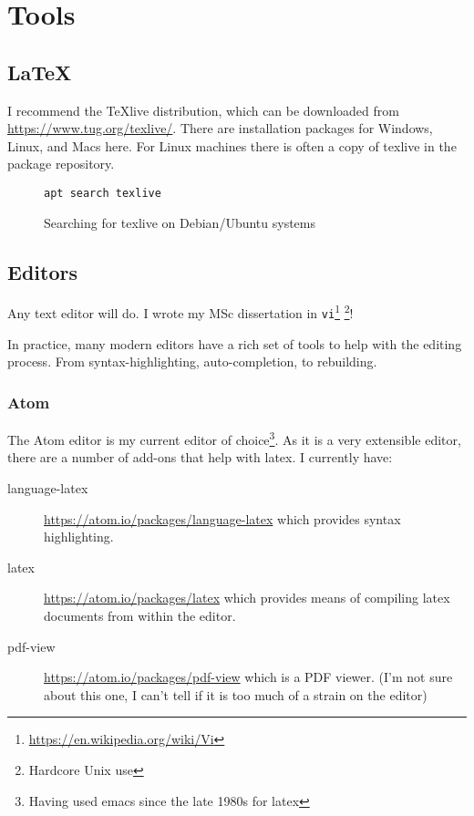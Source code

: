 
\chapter{Tools}

\section{\LaTeX}
I recommend the \TeX live distribution, which can be downloaded from
\url{https://www.tug.org/texlive/}.  There are installation packages for Windows, Linux, and Macs here.  For Linux machines there is often a copy of texlive in the package repository.

\begin{figure}[h]
\begin{verbatim}
apt search texlive
\end{verbatim}
    \caption{Searching for texlive on Debian/Ubuntu systems}
    \label{}
\end{figure}

\section{Editors}
Any text editor will do.   I wrote my MSc dissertation in \texttt{vi}\footnote{\url{https://en.wikipedia.org/wiki/Vi}}
\footnote{Hardcore Unix use}!

In practice, many modern editors have a rich set of tools to help with the editing process.  From syntax-highlighting, auto-completion, to rebuilding.

\subsection{Atom}
The Atom editor is my current editor of choice\footnote{Having used emacs since the late 1980s for latex}.  As it is a very extensible editor, there are a number of add-ons that help with latex.  I currently have:

\begin{description}
    \item[language-latex] \url{https://atom.io/packages/language-latex} which provides syntax highlighting.
    \item[latex] \url{https://atom.io/packages/latex} which provides means of compiling latex documents from within the editor.
    \item[pdf-view] \url{https://atom.io/packages/pdf-view} which is a PDF viewer.  (I'm not sure about this one, I can't tell if it is too much of a strain on the editor)
\end{description}

